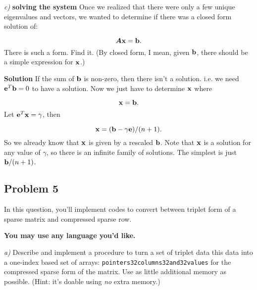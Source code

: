 \documentclass{article}
\begin{document}
\emph{c)} \textbf{solving the system} Once we realized that there were only a few unique eigenvalues and vectors, we wanted to determine if there was a closed form solution of:

\begin{displaymath}
\boldsymbol{A} \boldsymbol{\mathrm{x}} = \boldsymbol{\mathrm{b}}.
\end{displaymath}
There is such a form. Find it. (By closed form, I mean, given $\boldsymbol{\mathrm{b}}$, there should be a simple expression for $\boldsymbol{\mathrm{x}}$.)

\textbf{Solution} If the sum of $\boldsymbol{\mathrm{b}}$ is non-zero, then there isn'{}t a solution. i.e. we need $\boldsymbol{\mathrm{e}}^T \boldsymbol{\mathrm{b}} = 0$ to have a solution. Now we just have to determine $\boldsymbol{\mathrm{x}}$ where

\begin{displaymath}
[(n+1) \mI - \ve \ve^T ] \vx = \vb.
\end{displaymath}
Let $\boldsymbol{\mathrm{e}}^T \boldsymbol{\mathrm{x}} = \gamma$, then

\begin{displaymath}
\boldsymbol{\mathrm{x}} = (\boldsymbol{\mathrm{b}} - \gamma \boldsymbol{\mathrm{e}})/(n+1).
\end{displaymath}
So we already know that $\boldsymbol{\mathrm{x}}$ is given by a rescaled $\boldsymbol{\mathrm{b}}$. Note that $\boldsymbol{\mathrm{x}}$ is a solution for any value of $\gamma$, so there is an infinite family of solutions. The simplest is just $\boldsymbol{\mathrm{b}}/(n+1)$.

\hypertarget{problem_5_7}{}\subsection*{{Problem 5}}\label{problem_5_7}

In this question, you'{}ll implement codes to convert between triplet form of a sparse matrix and compressed sparse row.

\textbf{You may use any language you'{}d like.}

\emph{a)} Describe and implement a procedure to turn a set of triplet data this data into a one-index based set of arrays: {\colorbox[rgb]{1.00,0.93,1.00}{\tt pointers\char32columns\char32and\char32values}} for the compressed sparse form of the matrix. Use as little additional memory as possible. (Hint: it'{}s doable using \emph{no} extra memory.)
\end{document}
